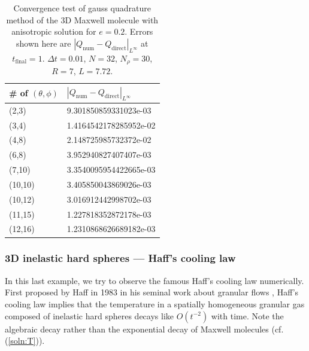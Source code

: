 \documentclass[review,times]{elsarticle}
\begin{document}
\begin{table}[htpb]
  \color{blue}
  \centering
  \begin{tabu} to 0.8\linewidth {X[1,c] X[2,c]}
    \toprule
    \# of $(\theta, \phi)$ & $|Q_\text{num} - Q_\text{direct}|_{L^{\infty}}$\\
    \midrule
    (2,3) & 9.301850859331023e-03 \\
    (3,4) & 1.4164542178285952e-02 \\
    (4,8) & 2.148725985732372e-02 \\
    (6,8) & 3.952940827407407e-03 \\
    (7,10) & 3.3540095954422665e-03 \\
    (10,10) & 3.405850043869026e-03 \\
    (10,12) & 3.016912442998702e-03 \\
    (11,15) & 1.227818352872178e-03 \\
    (12,16) & 1.2310868626689182e-03 \\
    \bottomrule
  \end{tabu}
  \caption{\color{blue} Convergence test of gauss quadrature method of the 3D Maxwell molecule with anisotropic solution for $e=0.2$. Errors shown here are $|Q_\text{num} - Q_\text{direct}|_{L^{\infty}}$ at $t_\text{final}=1$. $\Delta t = 0.01$, $N = 32$, $N_{\rho}=30$, $R=7$, $L=7.72$.}
  \label{3D_quadrature_conv_anisotropic}
\end{table}


\subsubsection{3D inelastic hard spheres --- Haff's cooling law}

In this last example, we try to observe the famous Haff's cooling law numerically. First proposed by Haff in 1983 in his seminal work about granular flows \cite{Haff83}, Haff's cooling law implies that the temperature in a spatially homogeneous granular gas composed of inelastic hard spheres decays like $O(t^{-2})$ with time. Note the algebraic decay rather than the exponential decay of Maxwell molecules (cf. (\ref{soln:T})).
\end{document}
